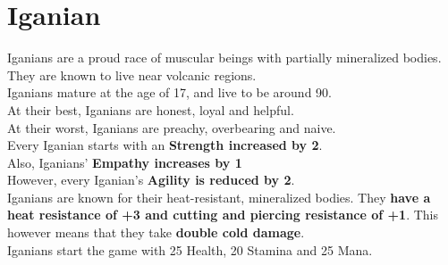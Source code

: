 \section{Iganian}
Iganians are a proud race of muscular beings with partially mineralized bodies. They are known to live near volcanic regions.\\
Iganians mature at the age of 17, and live to be around 90.\\
At their best, Iganians are honest, loyal and helpful.\\
At their worst, Iganians are preachy, overbearing and naive.\\
Every Iganian starts with an \textbf{Strength increased by 2}.\\
Also, Iganians' \textbf{Empathy increases by 1}\\
However, every Iganian's \textbf{Agility is reduced by 2}.\\
Iganians are known for their heat-resistant, mineralized bodies. They \textbf{have a heat resistance of +3 and cutting and piercing resistance of +1}. This however means that they take \textbf{double cold damage}.\\
Iganians start the game with 25 Health, 20 Stamina and 25 Mana.\\